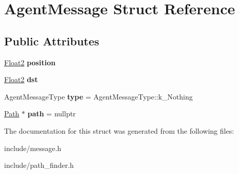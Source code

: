 \hypertarget{class_agent_message}{}\section{Agent\+Message Struct Reference}
\label{class_agent_message}
\subsection*{Public Attributes}
\begin{DoxyCompactItemize}
\item 
\mbox{\label{class_agent_message_afca360835630b16745d2901778d88586}} 
\mbox{\hyperlink{class_float2}{Float2}} {\bfseries position}
\item 
\mbox{\label{class_agent_message_a760c335b88befddfe6465df72be56af6}} 
\mbox{\hyperlink{class_float2}{Float2}} {\bfseries dst}
\item 
\mbox{\label{class_agent_message_aebb343482bd7c5c18d8fe6545d464c78}} 
Agent\+Message\+Type {\bfseries type} = Agent\+Message\+Type\+::k\+\_\+\+Nothing
\item 
\mbox{\label{class_agent_message_abc0e8d4fdd38545d067e47e4f45dd276}} 
\mbox{\hyperlink{class_path}{Path}} $\ast$ {\bfseries path} = nullptr
\end{DoxyCompactItemize}


The documentation for this struct was generated from the following files\+:\begin{DoxyCompactItemize}
\item 
include/message.\+h\item 
include/path\+\_\+finder.\+h\end{DoxyCompactItemize}
